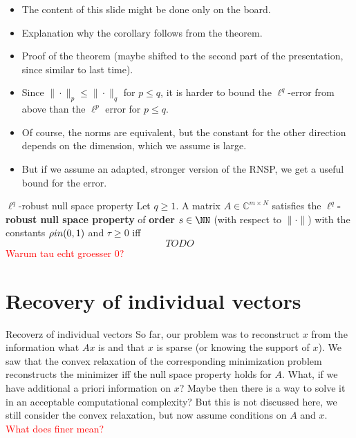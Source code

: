 \documentclass[11pt]{beamer}
\newcommand{\CC}{\mathbb{C}}
\renewcommand{\emph}{\textbf}
\begin{document}
\begin{frame}{}
    \begin{itemize}
    	\item The content of this slide might be done only on the board.
    	\item Explanation why the corollary follows from the theorem.
    	\item Proof of the theorem (maybe shifted to the second part of the presentation, since similar to last time).
    \end{itemize}
\end{frame}

\begin{frame}{}
\begin{itemize}
	\item Since \(\|\cdot\|_p\le \|\cdot\|_q\) for \(p\le q\), it is harder to bound the \(\ell^q\)-error from above than the \(\ell^p\) error for \(p\le q\). 
	\item  Of course, the norms are equivalent, but the constant for the other direction depends on the dimension, which we assume is large.
	\item But if we assume an adapted, stronger version of the RNSP, we get a useful bound for the error.
\end{itemize}
\end{frame}

\begin{frame}{}
 \begin{Def}
 {$\ell^q$-robust null space property}{}
 Let \(q\ge 1\). A matrix \(A\in \CC^{m\times N}\) satisfies the \emph{$\ell^q$-robust null space property} of \emph{order} \(s\in \NN\) (with respect to \(\|\cdot\|\)) with the constants \(\rho\\in (0,1)\) and \(\tau\ge0\) iff
 \[TODO\]
 \textcolor{red}{Warum tau echt groesser 0?}
 \end{Def}
 \end{frame}

\section{Recovery of individual vectors}
\begin{frame}{Recoverz of individual vectors}
    So far, our problem was to reconstruct \(x\) from the information what \(Ax\) is and that \(x\) is sparse (or knowing the support of \(x\)). We saw that the convex relaxation of the corresponding minimization problem reconstructs the minimizer iff the null space property holds for \(A\). What, if we have additional a priori information on \(x\)? Maybe then there is a way to solve it in an acceptable computational complexity? But this is not discussed here, we still consider the convex relaxation, but now assume conditions on \(A\) and \(x\). \textcolor{red}{What does finer mean?}
\end{frame}
\end{document}
